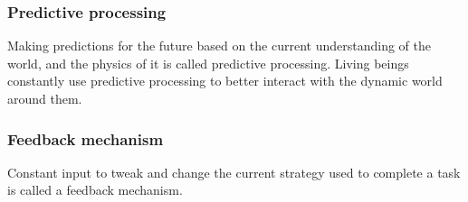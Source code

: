 \subsubsection{Predictive processing}

Making predictions for the future based on the current understanding of the world, and the physics of it is called predictive processing. Living beings constantly use predictive processing to better interact with the dynamic world around them. 

\subsubsection{Feedback mechanism}

Constant input to tweak and change the current strategy used to complete a task is called a feedback mechanism.
